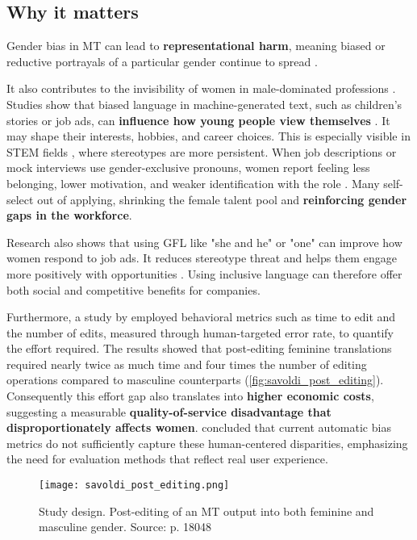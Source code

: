 \subsection{Why it matters}
Gender bias in MT can lead to \textbf{representational harm}, meaning biased or reductive portrayals of a particular gender continue to spread \citep{stanczakSurveyGenderBias2021}.

It also contributes to the invisibility of women in male-dominated professions \citep{kapplAreAllSpanish2025}. Studies show that biased language in machine-generated text, such as children’s stories or job ads, can \textbf{influence how young people view themselves} \citep{soundararajanInvestigatingGenderBias2024,kapplAreAllSpanish2025}. It may shape their interests, hobbies, and career choices. This is especially visible in STEM fields \citep{pratesAssessingGenderBias2019}, where stereotypes are more persistent. When job descriptions or mock interviews use gender-exclusive pronouns, women report feeling less belonging, lower motivation, and weaker identification with the role \citep{godsilEffectsGenderRoles2016}. Many self-select out of applying, shrinking the female talent pool and \textbf{reinforcing gender gaps in the workforce}.

Research also shows that using GFL like "she and he" or "one" can improve how women respond to job ads. It reduces stereotype threat and helps them engage more positively with opportunities \citep{godsilEffectsGenderRoles2016}. Using inclusive language can therefore offer both social and competitive benefits for companies.

Furthermore, a study by \citet{savoldiWhatHarmQuantifying2024} employed behavioral metrics such as time to edit and the number of edits, measured through human-targeted error rate, to quantify the effort required. The results showed that post-editing feminine translations required nearly twice as much time and four times the number of editing operations compared to masculine counterparts (\autoref{fig:savoldi_post_editing}). Consequently this effort gap also translates into \textbf{higher economic costs}, suggesting a measurable \textbf{quality-of-service disadvantage that disproportionately affects women}. \citeauthor{savoldiWhatHarmQuantifying2024} concluded that current automatic bias metrics do not sufficiently capture these human-centered disparities, emphasizing the need for evaluation methods that reflect real user experience.

\begin{figure}
	\centering
		\texttt{[image: savoldi\_post\_editing.png]}
	\caption{Study design. Post-editing of an MT output into both feminine and masculine gender. Source: \citet{savoldiWhatHarmQuantifying2024} p. 18048}
	\label{fig:savoldi_post_editing}
\end{figure}

